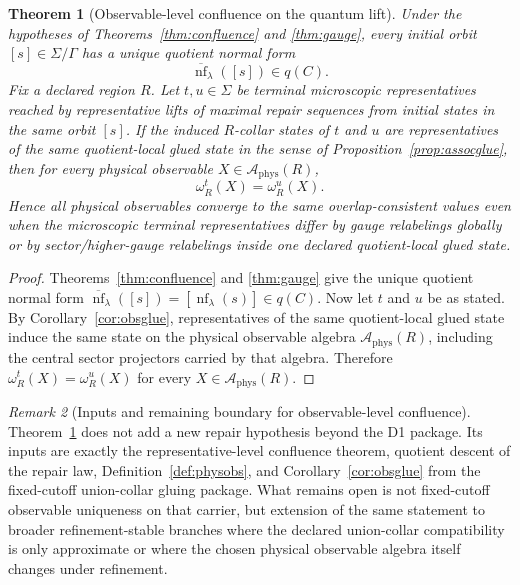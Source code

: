 \documentclass[11pt]{article}
\newtheorem{theorem}{Theorem}[section]
\theoremstyle{remark}
\newtheorem{remark}[theorem]{Remark}
\theoremstyle{plain}
\begin{document}
\begin{theorem}[Observable-level confluence on the quantum lift]\label{thm:obsconfluence}
Under the hypotheses of Theorems~\ref{thm:confluence} and \ref{thm:gauge}, every initial orbit
\([s]\in\Sigma/\Gamma\) has a unique quotient normal form
\[
\overline{\operatorname{nf}}_\lambda([s])\in q(C).
\]
Fix a declared region \(R\). Let \(t,u\in\Sigma\) be terminal microscopic representatives reached
by representative lifts of maximal repair sequences from initial states in the same orbit
\([s]\). If the induced \(R\)-collar states of \(t\) and \(u\) are representatives of the same
quotient-local glued state in the sense of
Proposition~\ref{prop:assocglue}, then for every physical observable
\(X\in\mathcal A_{\mathrm{phys}}(R)\),
\[
\omega_R^t(X)=\omega_R^u(X).
\]
Hence all physical observables converge to the same overlap-consistent values even when the
microscopic terminal representatives differ by gauge relabelings globally or by sector/higher-gauge
relabelings inside one declared quotient-local glued state.
\end{theorem}

\begin{proof}
Theorems~\ref{thm:confluence} and \ref{thm:gauge} give the unique quotient normal form
\(\overline{\operatorname{nf}}_\lambda([s])=[\operatorname{nf}_\lambda(s)]\in q(C)\). Now let
\(t\) and \(u\) be as stated. By Corollary~\ref{cor:obsglue}, representatives of the same
quotient-local glued state induce the same state on the physical observable algebra
\(\mathcal A_{\mathrm{phys}}(R)\), including the central sector projectors carried by that
algebra. Therefore \(\omega_R^t(X)=\omega_R^u(X)\) for every
\(X\in\mathcal A_{\mathrm{phys}}(R)\).
\end{proof}

\begin{remark}[Inputs and remaining boundary for observable-level confluence]\label{rem:obsconfluence}
Theorem~\ref{thm:obsconfluence} does not add a new repair hypothesis beyond the D1 package. Its
inputs are exactly the representative-level confluence theorem, quotient descent of the repair
law, Definition~\ref{def:physobs}, and Corollary~\ref{cor:obsglue} from the fixed-cutoff
union-collar gluing package. What remains open is not fixed-cutoff observable uniqueness on that
carrier, but extension of the same statement to broader refinement-stable branches where the
declared union-collar compatibility is only approximate or where the chosen physical observable
algebra itself changes under refinement.
\end{remark}
\end{document}
